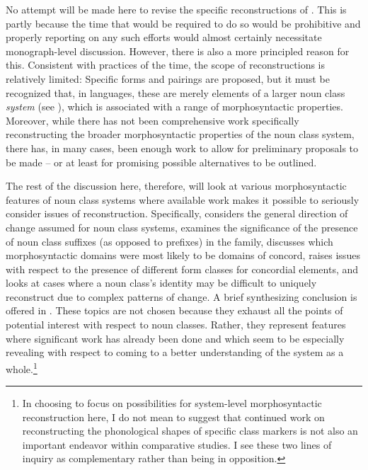 \documentclass[output=paper ,collection	  ,collectionchapter ,biblatexbackend=biber   ]{langscibook}
\begin{document}
No attempt will be made here to revise the specific reconstructions of
. This is partly because the time that would be required
to do so would be prohibitive and properly reporting on any such efforts would
almost certainly necessitate monograph-level discussion. However, there is also
a more principled reason for this. Consistent with practices of the time, the
scope of  reconstructions is relatively limited: Specific
forms and pairings are proposed, but it must be recognized that, in  languages, these are merely elements of a larger noun class
\emph{system} (see ), which is associated with a range of
morphosyntactic properties. Moreover, while there has not been comprehensive
work specifically reconstructing the broader morphosyntactic properties of the
 noun class system, there has, in many cases, been enough work
to allow for preliminary proposals to be made -- or at least for promising
possible alternatives to be outlined.

The rest of the discussion here, therefore, will look at various morphosyntactic
features of  noun class systems where available work makes it
possible to seriously consider issues of reconstruction. Specifically,  considers 
the general direction of change assumed for  noun class 
systems,  examines the significance of the presence of noun class suffixes 
(as opposed to prefixes) in the family,  discusses which morphosyntactic domains 
were most likely to be domains of concord,  raises issues with respect to the
presence of different form classes for concordial elements, and 
looks at cases where a noun class's identity may be difficult to uniquely
reconstruct due to complex patterns of change. A brief synthesizing conclusion
is offered in . These topics are not chosen because they exhaust
all the points of potential interest with respect to  noun
classes. Rather, they represent features where significant work has already been
done and which seem to be especially revealing with respect to coming to a
better understanding of the system as a whole.{\footnote{In choosing to focus on
possibilities for system-level morphosyntactic reconstruction here, I do not
mean to suggest that continued work on reconstructing the phonological shapes of
specific class markers is not also an important endeavor within comparative
 studies. I see these two lines of inquiry as complementary rather
than being in opposition.}}
\end{document}
